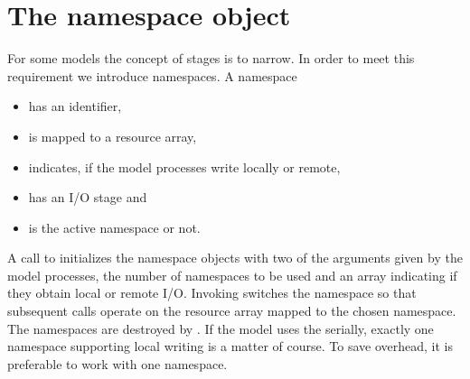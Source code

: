 \section{The namespace object}
\label{namespace}
For some models the concept of stages is to narrow. In order to meet this 
requirement we introduce namespaces. A namespace 
\begin{itemize}
\item has an identifier,
\item is mapped to a {\CDI} resource array,
\item indicates, if the model processes write locally or remote,
\item has an I/O stage and
\item is the active namespace or not.
\end{itemize}
A call to {} initializes the namespace objects with two 
of the arguments given by the model processes, the number of namespaces to be 
used and an array 
indicating if they obtain local or remote I/O. Invoking 
{} switches the namespace 
so that subsequent {\CDI} calls operate on the resource array mapped to the 
chosen namespace. The namespaces are destroyed by 
{}. If the model uses the {\CDI} serially, 
exactly one namespace supporting local writing is a matter of course. To save 
overhead, it is preferable to work with one namespace.
